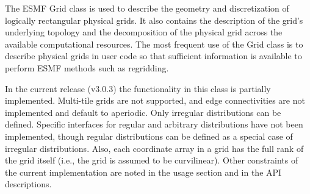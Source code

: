 %

The ESMF Grid class is used to describe the geometry and discretization
of logically rectangular physical grids.  It also contains the
description of the grid's underlying topology and the decomposition
of the physical grid across the available computational resources.
The most frequent use of the Grid class is to describe physical grids
in user code so that sufficient information is available to perform ESMF
methods such as regridding.  

In the current release (v3.0.3)
the functionality in this class is partially implemented.  
Multi-tile grids are not supported, and edge connectivities 
are not implemented and default to aperiodic.  Only irregular 
distributions can be defined.  Specific interfaces for regular
and arbitrary distributions have not been implemented, though
regular distributions can be defined as a special case of 
irregular distributions.  Also, each coordinate array in a 
grid has the full rank of the grid itself (i.e., the grid
is assumed to be curvilinear).  Other constraints of the current
implementation are noted in the usage section and in the API
descriptions.

